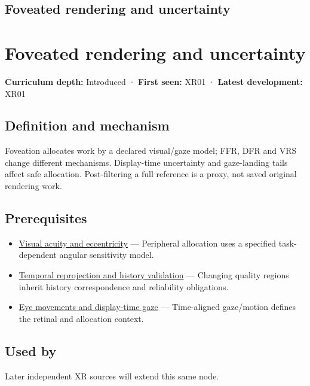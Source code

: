 \hypertarget{appendix-5878b813b732}{}
\section*{Foveated rendering and uncertainty}
\chapter{Foveated rendering and uncertainty}\label{appendix-5878b813b732-foveated-rendering-and-uncertainty}

\textbf{Curriculum depth:} Introduced · \textbf{First seen:} XR01 · \textbf{Latest development:} XR01

\section{Definition and mechanism}\label{appendix-5878b813b732-definition-and-mechanism}

Foveation allocates work by a declared visual/gaze model; FFR, DFR and VRS change different mechanisms. Display-time uncertainty and gaze-landing tails affect safe allocation. Post-filtering a full reference is a proxy, not saved original rendering work.

\section{Prerequisites}\label{appendix-5878b813b732-prerequisites}

\begin{itemize}
\tightlist
\item
  \hyperref[appendix-b491fc48c54b]{Visual acuity and eccentricity} --- Peripheral allocation uses a specified task-dependent angular sensitivity model.
\item
  \hyperref[appendix-0727340a4428]{Temporal reprojection and history validation} --- Changing quality regions inherit history correspondence and reliability obligations.
\item
  \hyperref[appendix-a6f2c4fe1996]{Eye movements and display-time gaze} --- Time-aligned gaze/motion defines the retinal and allocation context.
\end{itemize}

\section{Used by}\label{appendix-5878b813b732-used-by}

Later independent XR sources will extend this same node.

